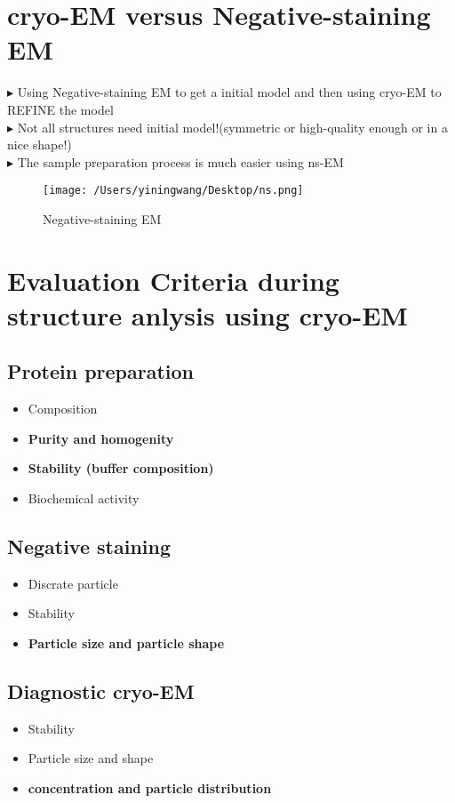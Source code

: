 \documentclass{article}
\begin{document}
    \section{cryo-EM versus Negative-staining EM}

    $\blacktriangleright $ Using Negative-staining EM to get a initial model and then using cryo-EM to 
    REFINE the model\\
    $\blacktriangleright $ Not all structures need initial model!(symmetric or high-quality enough or in a nice shape!)\\
    $\blacktriangleright $ The sample preparation process is much easier using ns-EM
    \begin{figure}[ht]
        \centering
        \texttt{[image: /Users/yiningwang/Desktop/ns.png]} 
        \caption{\small Negative-staining EM}
    \end{figure}

    
    \section{Evaluation Criteria during structure anlysis using cryo-EM}
    \subsection{Protein preparation}
    \begin{itemize}
        \item Composition
        \item \bf Purity and homogenity
        \item \bf Stability (buffer composition)
        \item Biochemical activity
    \end{itemize}
    
    \subsection{Negative staining}
    \begin{itemize}
        \item Discrate particle
        \item Stability
        \item  \bf Particle size and particle shape
    \end{itemize}
    \subsection{Diagnostic cryo-EM}
    \begin{itemize}
        \item Stability
        \item Particle size and shape
        \item \bf concentration and particle distribution
    \end{itemize}
\end{document}
